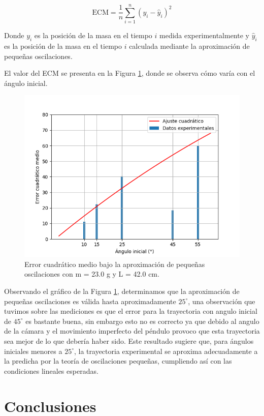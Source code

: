 \documentclass[12pt,a4]{article}
\begin{document}
\[
\text{ECM} = \frac{1}{n} \sum_{i=1}^{n} (y_i - \hat{y}_i)^2
\]

Donde $y_i$ es la posición de la masa en el tiempo $i$ medida experimentalmente y $\hat{y}_i$ es la posición de la masa en el tiempo $i$ calculada mediante la aproximación de pequeñas oscilaciones.

El valor del ECM se presenta en la Figura \ref{fig:pequeñas_oscilaciones}, donde se observa cómo varía con el ángulo inicial.

\begin{figure}[H]
    \centering
    \includegraphics[width=0.6\linewidth]{peq_oscilaciones.png}
    \caption{Error cuadrático medio bajo la aproximación de pequeñas oscilaciones con m = 23.0 g y L = 42.0 cm.}
    \label{fig:pequeñas_oscilaciones}
\end{figure}

Observando el gráfico de la Figura \ref{fig:pequeñas_oscilaciones}, determinamos que la aproximación de pequeñas oscilaciones es válida hasta aproximadamente $25^\circ$, una observación que tuvimos sobre las mediciones es que el error para la trayectoria con angulo inicial de $45^\circ$ es bastante buena, sin embargo esto no es correcto ya que debido al angulo de la cámara y el movimiento imperfecto del péndulo provoco que esta trayectoria sea mejor de lo que debería haber sido. Este resultado sugiere que, para ángulos iniciales menores a $25^\circ$, la trayectoria experimental se aproxima adecuadamente a la predicha por la teoría de oscilaciones pequeñas, cumpliendo así con las condiciones lineales esperadas.

\section{Conclusiones}
\end{document}
